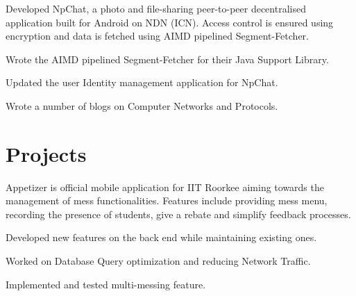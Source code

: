 \documentclass[letterpaper]{deedy-resume} %
\begin{document}
\begin{minipage}[t]{0.66\textwidth}
\sectionspace %

\begin{tightitemize}
\item Developed NpChat, a photo and ﬁle-sharing peer-to-peer decentralised application built for Android on NDN (ICN). Access control is ensured using encryption and data is fetched using AIMD pipelined Segment-Fetcher.
\item Wrote the AIMD pipelined Segment-Fetcher for their Java Support Library.
\item Updated the user Identity management application for NpChat.
\end{tightitemize}

\sectionspace %

Wrote a number of blogs on Computer Networks and Protocols.


\sectionspace %


\section{Projects} 

Appetizer is official mobile application for IIT Roorkee aiming towards the management of mess functionalities. Features include providing mess menu, recording the presence of students, give a rebate and simplify feedback processes.
\begin{tightitemize}
\item Developed new features on the back end while maintaining existing ones.
\item Worked on Database Query optimization and reducing Network Traffic.
\item Implemented and tested multi-messing feature.
\end{tightitemize}
\sectionspace %


\end{minipage}
\end{document}
